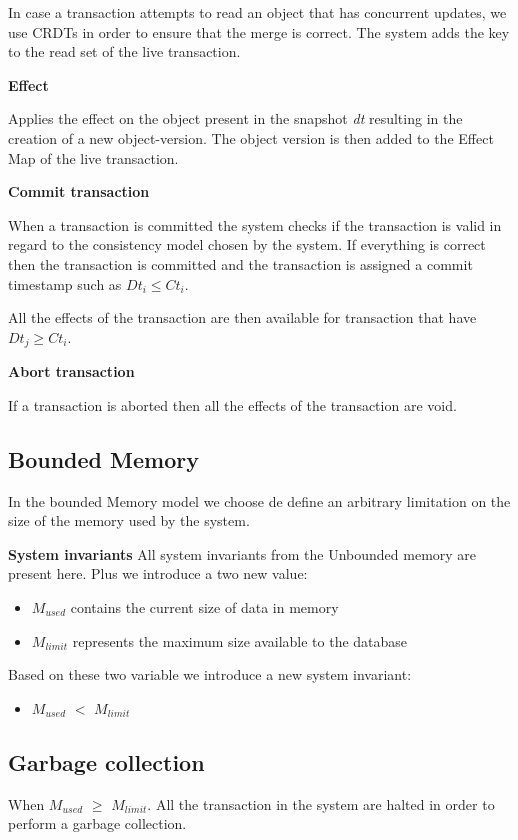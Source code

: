 \documentclass[parallelisme]{compas2022}
\begin{document}
In case a transaction attempts to read an object that has concurrent updates, we use CRDTs in order to ensure that the merge is correct.
The system adds the key to the read set of the live transaction.

\textbf{Effect}

Applies the effect on the object present in the snapshot \emph{dt} resulting in the creation of a new object-version.
The object version is then added to the Effect Map of the live transaction.

\textbf{Commit transaction}

When a transaction is committed the system checks if the transaction is valid in regard to the consistency model chosen by the system.
If everything is correct then the transaction is committed and the transaction is assigned a commit timestamp such as $Dt_i \leq Ct_i$.

All the effects of the transaction are then available for transaction that have $Dt_j \geq Ct_i$.


\textbf{Abort transaction}

If a transaction is aborted then all the effects of the transaction are void.

\subsection{Bounded Memory}

In the bounded Memory model we choose de define an arbitrary limitation on the size of the memory used by the system.

\textbf{System invariants}
All system invariants from the Unbounded memory are present here.
Plus we introduce a two new value:
\begin{itemize}
  \item \emph{$M_{used}$} contains the current size of data in memory
  \item \emph{$M_{limit}$} represents the maximum size available to the database
\end{itemize}
Based on these two variable we introduce a new system invariant:
\begin{itemize}
  \item \emph{$M_{used}$} $<$ \emph{$M_{limit}$}
\end{itemize}

\subsection{Garbage collection}
When \emph{$M_{used}$} $\geq$ \emph{$M_{limit}$}. 
All the transaction in the system are halted in order to perform a garbage collection.
\end{document}
